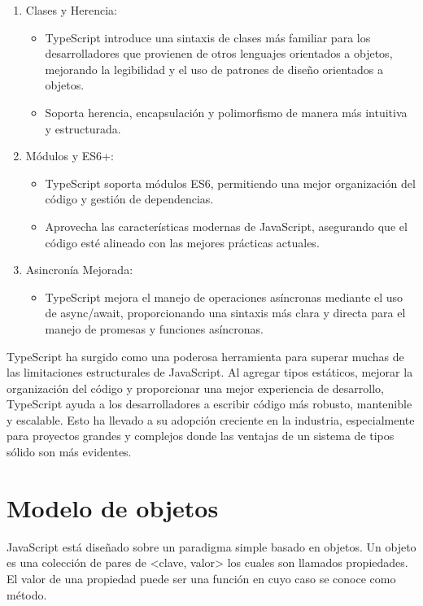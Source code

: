 \documentclass{article}
\begin{document}
\begin{enumerate}
    \item Clases y Herencia:
          \begin{itemize}
              \item TypeScript introduce una sintaxis de clases más familiar para los desarrolladores que provienen
                    de otros lenguajes orientados a objetos, mejorando la legibilidad y el uso de patrones de diseño
                    orientados a objetos.
              \item  Soporta herencia, encapsulación y polimorfismo de manera más intuitiva y estructurada.
          \end{itemize}
    \item Módulos y ES6+:
          \begin{itemize}
              \item TypeScript soporta módulos ES6, permitiendo una mejor organización del código y gestión de
                    dependencias.
              \item Aprovecha las características modernas de JavaScript, asegurando que el código esté alineado con
                    las mejores prácticas actuales.
          \end{itemize}
    \item Asincronía Mejorada:
          \begin{itemize}
              \item TypeScript mejora el manejo de operaciones asíncronas mediante el uso de async/await,
                    proporcionando una sintaxis más clara y directa para el manejo de promesas y funciones asíncronas.
          \end{itemize}
\end{enumerate}

TypeScript ha surgido como una poderosa herramienta para superar muchas de las limitaciones estructurales de
JavaScript. Al agregar tipos estáticos, mejorar la organización del código y proporcionar una mejor experiencia
de desarrollo, TypeScript ayuda a los desarrolladores a escribir código más robusto, mantenible y escalable. Esto
ha llevado a su adopción creciente en la industria, especialmente para proyectos grandes y complejos donde las
ventajas de un sistema de tipos sólido son más evidentes.

\section*{Modelo de objetos}

JavaScript está diseñado sobre un paradigma simple basado en objetos. Un objeto es una colección de pares de
<clave, valor> los cuales son llamados propiedades. El valor de una propiedad puede ser una función en cuyo caso
se conoce como método.
\end{document}
